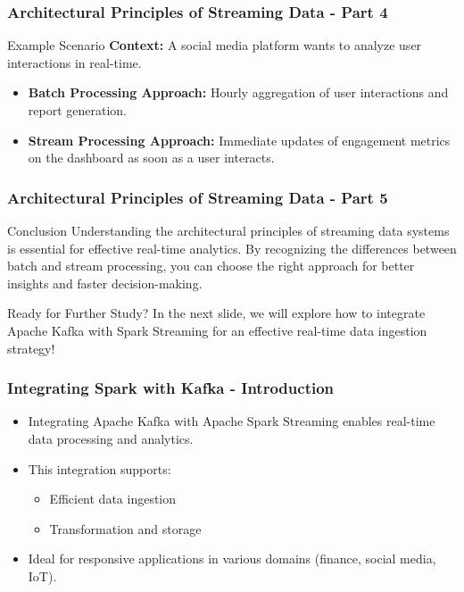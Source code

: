 \documentclass[aspectratio=169]{beamer}
\begin{document}
\begin{frame}[fragile]
    \frametitle{Architectural Principles of Streaming Data - Part 4}
    \begin{block}{Example Scenario}
        \textbf{Context:} A social media platform wants to analyze user interactions in real-time.
        \begin{itemize}
            \item \textbf{Batch Processing Approach:} Hourly aggregation of user interactions and report generation.
            \item \textbf{Stream Processing Approach:} Immediate updates of engagement metrics on the dashboard as soon as a user interacts.
        \end{itemize}
    \end{block}
\end{frame}

\begin{frame}[fragile]
    \frametitle{Architectural Principles of Streaming Data - Part 5}
    \begin{block}{Conclusion}
        Understanding the architectural principles of streaming data systems is essential for effective real-time analytics. By recognizing the differences between batch and stream processing, you can choose the right approach for better insights and faster decision-making.
    \end{block}
    \begin{block}{Ready for Further Study?}
        In the next slide, we will explore how to integrate Apache Kafka with Spark Streaming for an effective real-time data ingestion strategy!
    \end{block}
\end{frame}

\begin{frame}
    \frametitle{Integrating Spark with Kafka - Introduction}
    \begin{itemize}
        \item Integrating Apache Kafka with Apache Spark Streaming enables real-time data processing and analytics.
        \item This integration supports:
        \begin{itemize}
            \item Efficient data ingestion
            \item Transformation and storage
        \end{itemize}
        \item Ideal for responsive applications in various domains (finance, social media, IoT).
    \end{itemize}
\end{frame}
\end{document}
